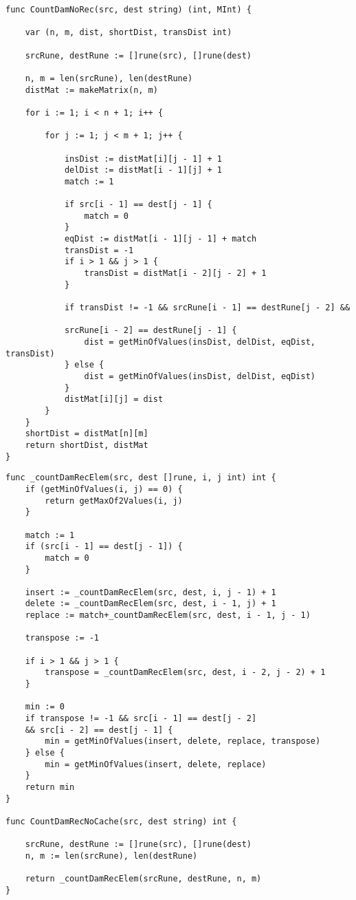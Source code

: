 \begin{lstlisting}[label=leven-recursive,caption=Программный код нахождения расстояния Дамерау\,--\,Левенштейна итеративно]
func CountDamNoRec(src, dest string) (int, MInt) {
	
	var (n, m, dist, shortDist, transDist int)
	
	srcRune, destRune := []rune(src), []rune(dest)
	
	n, m = len(srcRune), len(destRune)
	distMat := makeMatrix(n, m)
	
	for i := 1; i < n + 1; i++ {
		
		for j := 1; j < m + 1; j++ {
			
			insDist := distMat[i][j - 1] + 1
			delDist := distMat[i - 1][j] + 1
			match := 1
			
			if src[i - 1] == dest[j - 1] {
				match = 0
			}
			eqDist := distMat[i - 1][j - 1] + match
			transDist = -1
			if i > 1 && j > 1 {
				transDist = distMat[i - 2][j - 2] + 1
			}
		
			if transDist != -1 && srcRune[i - 1] == destRune[j - 2] && 
			
			srcRune[i - 2] == destRune[j - 1] {
				dist = getMinOfValues(insDist, delDist, eqDist, transDist)
			} else {
				dist = getMinOfValues(insDist, delDist, eqDist)
			}
			distMat[i][j] = dist
		}
	}
	shortDist = distMat[n][m]
	return shortDist, distMat
}
\end{lstlisting}

\begin{lstlisting}[label=damer-lev-iter,caption=Программный код нахождения расстояния Дамерау\,--\,Левенштейна рекурсивно]
func _countDamRecElem(src, dest []rune, i, j int) int {
	if (getMinOfValues(i, j) == 0) {
		return getMaxOf2Values(i, j)
	}
	
	match := 1
	if (src[i - 1] == dest[j - 1]) {
		match = 0
	}
	
	insert := _countDamRecElem(src, dest, i, j - 1) + 1
	delete := _countDamRecElem(src, dest, i - 1, j) + 1
	replace := match+_countDamRecElem(src, dest, i - 1, j - 1)
	
	transpose := -1
	
	if i > 1 && j > 1 {
		transpose = _countDamRecElem(src, dest, i - 2, j - 2) + 1
	}
	
	min := 0
	if transpose != -1 && src[i - 1] == dest[j - 2] 
	&& src[i - 2] == dest[j - 1] {
		min = getMinOfValues(insert, delete, replace, transpose)
	} else {
		min = getMinOfValues(insert, delete, replace)
	}
	return min
}

func CountDamRecNoCache(src, dest string) int {
	
	srcRune, destRune := []rune(src), []rune(dest)
	n, m := len(srcRune), len(destRune)
	
	return _countDamRecElem(srcRune, destRune, n, m)
}
\end{lstlisting}

